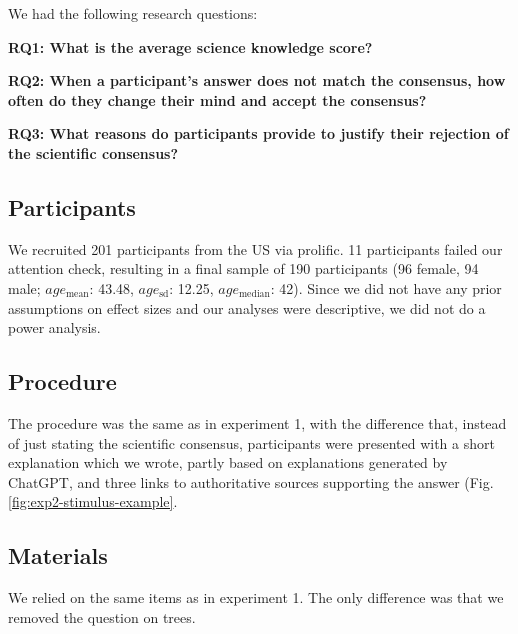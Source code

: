 \documentclass[
  doc,floatsintext]{apa6}
\begin{document}
We had the following research questions:

\textbf{RQ1: What is the average science knowledge score?}

\textbf{RQ2: When a participant's answer does not match the consensus, how often do they change their mind and accept the consensus?}

\textbf{RQ3: What reasons do participants provide to justify their rejection of the scientific consensus?}

\subsection{Participants}\label{participants-2}

We recruited 201 participants from the US via prolific. 11 participants failed our attention check, resulting in a final sample of 190 participants (96 female, 94 male; \(age_\text{mean}\): 43.48, \(age_\text{sd}\): 12.25, \(age_\text{median}\): 42). Since we did not have any prior assumptions on effect sizes and our analyses were descriptive, we did not do a power analysis.

\subsection{Procedure}\label{procedure-1}

The procedure was the same as in experiment 1, with the difference that, instead of just stating the scientific consensus, participants were presented with a short explanation which we wrote, partly based on explanations generated by ChatGPT, and three links to authoritative sources supporting the answer (Fig. \ref{fig:exp2-stimulus-example}.

\subsection{Materials}\label{materials-3}

We relied on the same items as in experiment 1. The only difference was that we removed the question on trees.

\FloatBarrier
\end{document}
